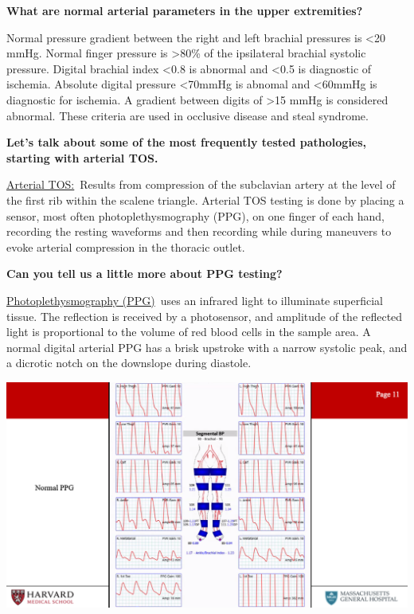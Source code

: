 \documentclass[
]{book}
\begin{document}
\textbf{What are normal arterial parameters in the upper extremities?}

Normal pressure gradient between the right and left brachial pressures
is \textless20 mmHg. Normal finger pressure is \textgreater80\% of the ipsilateral
brachial systolic pressure. Digital brachial index \textless0.8 is abnormal and
\textless0.5 is diagnostic of ischemia. Absolute digital pressure \textless70mmHg is
abnomal and \textless60mmHg is diagnostic for ischemia. A gradient between
digits of \textgreater15 mmHg is considered abnormal. These criteria are used in
occlusive disease and steal syndrome.\citep{chloros2008, sen2016}

\textbf{Let's talk about some of the most frequently tested pathologies,
starting with arterial TOS.}

\uline{Arterial TOS:}~Results from compression of the subclavian
artery at the level of the first rib within the scalene triangle.
Arterial TOS testing is done by placing a sensor, most often
photoplethysmography (PPG), on one finger of each hand, recording the
resting waveforms and then recording while during maneuvers to evoke
arterial compression in the thoracic outlet.\citep{size2013}

\textbf{Can you tell us a little more about PPG testing?}

\uline{Photoplethysmography (PPG)}~uses an infrared light to
illuminate superficial tissue. The reflection is received by a
photosensor, and amplitude of the reflected light is proportional to the
volume of red blood cells in the sample area. A normal digital arterial
PPG has a brisk upstroke with a narrow systolic peak, and a dicrotic
notch on the downslope during diastole.\citep{carter2001}

\includegraphics[width=15.01in]{images/vasc_lab2/Slide12}
\end{document}
